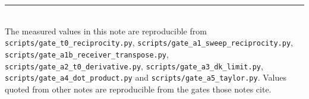 \documentclass[11pt,a4paper]{article}
\begin{document}
\vfill
\noindent\rule{\linewidth}{0.4pt}\\
{\footnotesize The measured values in this note are reproducible from
\nolinkurl{scripts/gate_t0_reciprocity.py}, \nolinkurl{scripts/gate_a1_sweep_reciprocity.py},
\nolinkurl{scripts/gate_a1b_receiver_transpose.py},
\nolinkurl{scripts/gate_a2_t0_derivative.py}, \nolinkurl{scripts/gate_a3_dk_limit.py},
\nolinkurl{scripts/gate_a4_dot_product.py} and \nolinkurl{scripts/gate_a5_taylor.py}.
Values quoted from other notes are reproducible from the gates those notes cite.}
\end{document}
